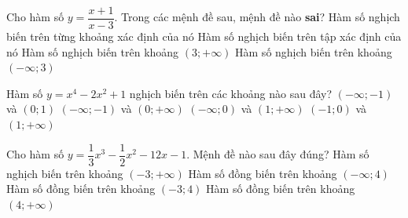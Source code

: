 \begin{ex}%
	Cho hàm số $y=\dfrac{x+1}{x-3}$. Trong các mệnh đề sau, mệnh đề nào  \textbf{sai}?
	 \choice
		{Hàm số nghịch biến trên từng khoảng xác định của  nó}
		{\True  Hàm số nghịch biến trên tập xác định của nó}
		{Hàm  số nghịch biến trên khoảng $(3;+\infty)$}
		 {Hàm số nghịch biến trên khoảng $(-\infty; 3)$}
\end{ex}

\begin{ex}%
	Hàm số $y=x^4-2x^2+1$ nghịch biến  trên các khoảng nào sau đây?
	 \choice
		{\True  $(-\infty;-1)$ và $(0;1)$}
		{$(-\infty;-1)$ và  $(0;+\infty)$}
		{$(-\infty;0)$ và  $(1;+\infty)$}
		 {$(-1;0)$ và $(1;+\infty)$}
\end{ex}

\begin{ex}%
	Cho hàm số $y=\dfrac{1}{3}x^3-\dfrac{1}{2}x^2-12x-1$.  Mệnh đề nào sau đây đúng?
	\choice 
		{Hàm số nghịch biến trên  khoảng $(-3;+\infty)$}
		{Hàm số đồng biến trên khoảng  $(-\infty;4)$}
		 {Hàm số đồng biến trên khoảng $(-3;4)$}
		{\True Hàm số đồng biến trên khoảng  $(4;+\infty)$}
\end{ex}

